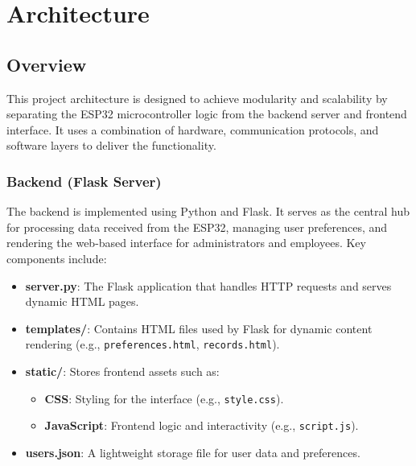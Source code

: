 \documentclass[a4paper,12pt]{report}
\begin{document}
\chapter{Architecture}

\section{Overview}
This project architecture is designed to achieve modularity and scalability by separating the ESP32 microcontroller logic from the backend server and frontend interface. It uses a combination of hardware, communication protocols, and software layers to deliver the functionality.

\subsection{Backend (Flask Server)}
The backend is implemented using Python and Flask. It serves as the central hub for processing data received from the ESP32, managing user preferences, and rendering the web-based interface for administrators and employees. Key components include:
\begin{itemize}
    \item \textbf{server.py}: The Flask application that handles HTTP requests and serves dynamic HTML pages.
    \item \textbf{templates/}: Contains HTML files used by Flask for dynamic content rendering (e.g., \texttt{preferences.html}, \texttt{records.html}).
    \item \textbf{static/}: Stores frontend assets such as:
        \begin{itemize}
            \item \textbf{CSS}: Styling for the interface (e.g., \texttt{style.css}).
            \item \textbf{JavaScript}: Frontend logic and interactivity (e.g., \texttt{script.js}).
        \end{itemize}
    \item \textbf{users.json}: A lightweight storage file for user data and preferences.
\end{itemize}
\end{document}
